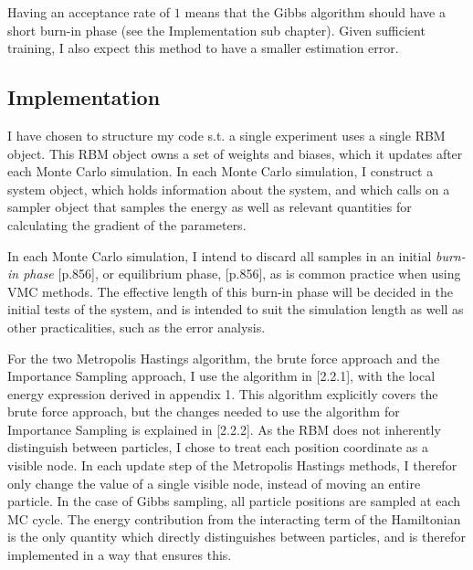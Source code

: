 \documentclass[%
oneside,                 %
final,                   %
10pt]{article}
\begin{document}
Having an acceptance rate of $1$ means that the Gibbs algorithm should have a short burn-in phase (see the Implementation sub chapter). Given sufficient training, I also expect this method to have a smaller estimation error. 

\subsection{Implementation} 
I have chosen to structure my code s.t. a single experiment uses a single RBM object. This RBM object owns a set of weights and biases, which it updates after each Monte Carlo simulation. In each Monte Carlo simulation, I construct a system object, which holds information about the system, and which calls on a sampler object that samples the energy as well as relevant quantities for calculating the gradient of the parameters. 

In each Monte Carlo simulation, I intend to discard all samples in an initial \textit{burn-in phase} \citep{MLMurphy}[p.856], or equilibrium phase, \citep{MLMurphy}[p.856], as is common practice when using VMC methods. The effective length of this burn-in phase will be decided in the initial tests of the system, and is intended to suit the simulation length as well as other practicalities, such as the error analysis.

For the two Metropolis Hastings algorithm, the brute force approach and the Importance Sampling approach, I use the algorithm in \cite{JN_P1}[2.2.1], with the local energy expression derived in appendix 1. This algorithm explicitly covers the brute force approach, but the changes needed to use the algorithm for Importance Sampling is explained in \cite{JN_P1}[2.2.2]. As the RBM does not inherently distinguish between particles, I chose to treat each position coordinate as a visible node. In each update step of the Metropolis Hastings methods, I therefor only change the value of a single visible node, instead of moving an entire particle. In the case of Gibbs sampling, all particle positions are sampled at each MC cycle. The energy contribution from the interacting term of the Hamiltonian is the only quantity which directly distinguishes between particles, and is therefor implemented in a way that ensures this. 
 
\end{document}
